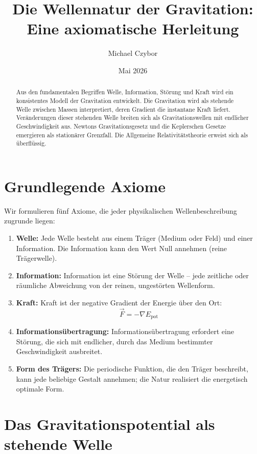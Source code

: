 \documentclass[11pt]{article}
\title{Die Wellennatur der Gravitation: Eine axiomatische Herleitung}
\author{Michael Czybor}
\date{Mai 2026}
\begin{document}
\maketitle

\begin{abstract}
Aus den fundamentalen Begriffen Welle, Information, Störung und Kraft wird ein konsistentes Modell der Gravitation entwickelt. Die Gravitation wird als stehende Welle zwischen Massen interpretiert, deren Gradient die instantane Kraft liefert. Veränderungen dieser stehenden Welle breiten sich als Gravitationswellen mit endlicher Geschwindigkeit aus. Newtons Gravitationsgesetz und die Keplerschen Gesetze emergieren als stationärer Grenzfall. Die Allgemeine Relativitätstheorie erweist sich als überflüssig.
\end{abstract}

\section{Grundlegende Axiome}

Wir formulieren fünf Axiome, die jeder physikalischen Wellenbeschreibung zugrunde liegen:

\begin{enumerate}
    \item \textbf{Welle:} Jede Welle besteht aus einem Träger (Medium oder Feld) und einer Information. Die Information kann den Wert Null annehmen (reine Trägerwelle).
    \item \textbf{Information:} Information ist eine Störung der Welle – jede zeitliche oder räumliche Abweichung von der reinen, ungestörten Wellenform.
    \item \textbf{Kraft:} Kraft ist der negative Gradient der Energie über den Ort:
    \begin{equation}
        \vec{F} = -\nabla E_{\text{pot}}
    \end{equation}
    \item \textbf{Informationsübertragung:} Informationsübertragung erfordert eine Störung, die sich mit endlicher, durch das Medium bestimmter Geschwindigkeit ausbreitet.
    \item \textbf{Form des Trägers:} Die periodische Funktion, die den Träger beschreibt, kann jede beliebige Gestalt annehmen; die Natur realisiert die energetisch optimale Form.
\end{enumerate}

\section{Das Gravitationspotential als stehende Welle}
\end{document}
